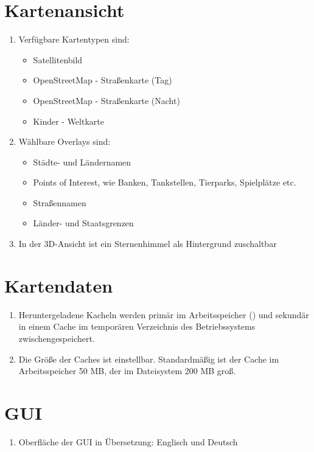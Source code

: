 \documentclass[10pt]{scrreprt}
\begin{document}
\section{Kartenansicht}
\begin{enumerate}[leftmargin=2cm]
\item Verfügbare Kartentypen sind:
\begin{itemize}
\item Satellitenbild
\item OpenStreetMap - Straßenkarte (Tag)
\item \W OpenStreetMap - Straßenkarte (Nacht)
\item \W Kinder - Weltkarte
\end{itemize}
\item Wählbare Overlays sind:
\begin{itemize}
\item Städte- und Ländernamen
\item Points of Interest, wie Banken, Tankstellen, Tierparks, Spielplätze etc.
\item Straßennamen
\item \W Länder- und Staatsgrenzen
\end{itemize}
\item \W In der 3D-Ansicht ist ein Sternenhimmel als Hintergrund zuschaltbar
\end{enumerate}

\section{Kartendaten}
\begin{enumerate}[leftmargin=2cm,resume]
\item Heruntergeladene Kacheln werden primär im Arbeitsspeicher (\W) und sekundär in einem Cache im temporären Verzeichnis des Betriebssystems zwischengespeichert.
\item Die Größe der Caches ist einstellbar. Standardmäßig ist der Cache im Arbeitsspeicher 50 MB, der im Dateisystem 200 MB groß.
\end{enumerate}

\section{GUI}
\begin{enumerate}[leftmargin=2cm,resume]
\item Oberfläche der GUI in Übersetzung: Englisch und Deutsch
\end{enumerate}
\end{document}
